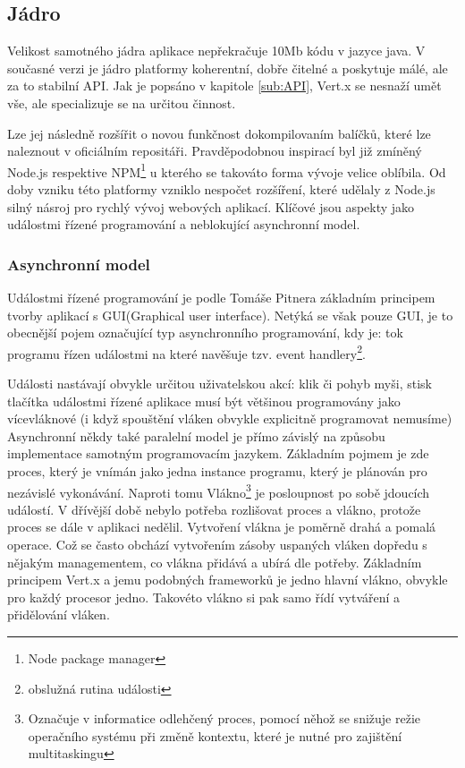\subsection{Jádro}

Velikost samotného jádra aplikace nepřekračuje 10Mb kódu v jazyce java. V současné verzi je jádro platformy koherentní, dobře čitelné a poskytuje málé, ale za to stabilní API. Jak je popsáno v kapitole \ref{sub:API}, Vert.x se nesnaží umět vše, ale specializuje se na určitou činnost. 

Lze jej následně rozšířit o novou funkčnost dokompilovaním balíčků, které lze naleznout v oficiálním repositáři. Pravděpodobnou inspirací byl již zmíněný Node.js respektive NPM\footnote{Node package manager} u kterého se takováto forma vývoje velice oblíbila. Od doby vzniku této platformy vzniklo nespočet rozšíření, které udělaly z Node.js silný násroj pro rychlý vývoj webových aplikací. 
Klíčové jsou aspekty jako událostmi řízené programování a neblokující asynchronní model.

\subsubsection{Asynchronní model}

Událostmi řízené programování je podle Tomáše Pitnera\cite{javaProgramovani} základním principem tvorby aplikací s GUI(Graphical user interface). Netýká se však pouze GUI, je to obecnější pojem označující typ asynchronního programování, kdy je: tok programu řízen událostmi na které navěšuje tzv. event handlery\footnote{obslužná rutina události}.

Události nastávají obvykle určitou uživatelskou akcí: klik či pohyb myši, stisk tlačítka
událostmi řízené aplikace musí být většinou programovány jako vícevláknové (i když spouštění vláken obvykle explicitně programovat nemusíme)
Asynchronní někdy také paralelní model je přímo závislý na způsobu implementace samotným programovacím jazykem. Základním pojmem je zde proces, který je vnímán jako jedna instance programu, který je plánován pro nezávislé vykonávání. Naproti tomu Vlákno\footnote{Označuje v informatice odlehčený proces, pomocí něhož se snižuje režie operačního systému při změně kontextu, které je nutné pro zajištění multitaskingu} je posloupnost po sobě jdoucích událostí. V dřívější době nebylo potřeba rozlišovat proces a vlákno, protože proces se dále v aplikaci nedělil. Vytvoření vlákna je poměrně drahá a pomalá operace. Což se často obchází vytvořením zásoby uspaných vláken dopředu s nějakým managementem, co vlákna přidává a ubírá dle potřeby. Základním principem Vert.x a jemu podobných frameworků je jedno hlavní vlákno, obvykle pro každý procesor jedno. Takovéto vlákno si pak samo řídí vytváření a přidělování vláken.

